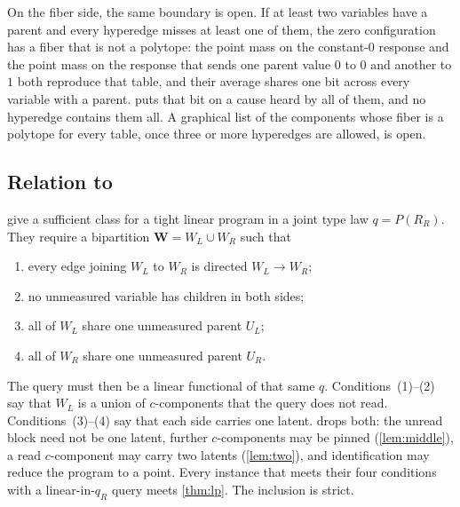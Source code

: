On the fiber side, the same boundary is open. If at least two variables have a parent and every hyperedge misses at least one of them, the zero configuration has a fiber that is not a polytope: the point mass on the constant-$0$ response and the point mass on the response that sends one parent value $0$ to $0$ and another to $1$ both reproduce that table, and their average shares one bit across every variable with a parent.  puts that bit on a cause heard by all of them, and no hyperedge contains them all. A graphical list of the components whose fiber is a polytope for every table, once three or more hyperedges are allowed, is open.

\subsection[Relation to Sachs et al.]{Relation to \citet{symbolicbounds2023general}}
\label{sec:sachs}

\citet[Proposition~2]{symbolicbounds2023general} give a sufficient class for
a tight linear program in a joint type law $q=P(R_R)$. They require a
bipartition $\mathbf{W}=W_L\cup W_R$ such that
\begin{enumerate}[label=(\arabic*),leftmargin=1.6em,itemsep=0.15em]
\item every edge joining $W_L$ to $W_R$ is directed $W_L\to W_R$;
\item no unmeasured variable has children in both sides;
\item all of $W_L$ share one unmeasured parent $U_L$;
\item all of $W_R$ share one unmeasured parent $U_R$.
\end{enumerate}
The query must then be a linear functional of that same $q$.
Conditions~(1)--(2) say that $W_L$ is a union of $c$-components that the
query does not read. Conditions~(3)--(4) say that each side carries one
latent.  drops both: the unread block need not be one latent,
further $c$-components may be pinned (\cref{lem:middle}), a read
$c$-component may carry two latents (\cref{lem:two}), and identification may
reduce the program to a point. Every instance that meets their four
conditions with a linear-in-$q_R$ query meets \cref{thm:lp}. The inclusion
is strict.

